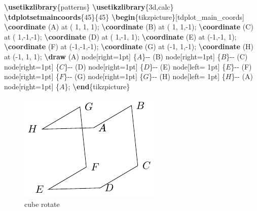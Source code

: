 \documentclass[
]{book}
\newenvironment{Shaded}{\begin{snugshade}}{\end{snugshade}}
\newcommand{\ExtensionTok}[1]{#1}
\newcommand{\FunctionTok}[1]{\textcolor[rgb]{0.13,0.29,0.53}{\textbf{#1}}}
\newcommand{\KeywordTok}[1]{\textcolor[rgb]{0.13,0.29,0.53}{\textbf{#1}}}
\newcommand{\NormalTok}[1]{#1}
\newcommand{\SpecialStringTok}[1]{\textcolor[rgb]{0.31,0.60,0.02}{#1}}
\theoremstyle{definition}
\theoremstyle{definition}
\theoremstyle{definition}
\theoremstyle{definition}
\theoremstyle{remark}
\begin{document}
\begin{Shaded}
\begin{Highlighting}[]
\FunctionTok{\textbackslash{}usetikzlibrary}\NormalTok{\{patterns\}}
\FunctionTok{\textbackslash{}usetikzlibrary}\NormalTok{\{3d,calc\}}
\FunctionTok{\textbackslash{}tdplotsetmaincoords}\NormalTok{\{45\}\{45\}}
\KeywordTok{\textbackslash{}begin}\NormalTok{\{}\ExtensionTok{tikzpicture}\NormalTok{\}[tdplot\_main\_coords]}
  \FunctionTok{\textbackslash{}coordinate}\NormalTok{ (A) at ( 1, 1, 1);}
  \FunctionTok{\textbackslash{}coordinate}\NormalTok{ (B) at ( 1, 1,{-}1);}
  \FunctionTok{\textbackslash{}coordinate}\NormalTok{ (C) at ( 1,{-}1,{-}1);}
  \FunctionTok{\textbackslash{}coordinate}\NormalTok{ (D) at ( 1,{-}1, 1);}
  \FunctionTok{\textbackslash{}coordinate}\NormalTok{ (E) at ({-}1,{-}1, 1);}
  \FunctionTok{\textbackslash{}coordinate}\NormalTok{ (F) at ({-}1,{-}1,{-}1);}
  \FunctionTok{\textbackslash{}coordinate}\NormalTok{ (G) at ({-}1, 1,{-}1);}
  \FunctionTok{\textbackslash{}coordinate}\NormalTok{ (H) at ({-}1, 1, 1);}
  \FunctionTok{\textbackslash{}draw}\NormalTok{ (A) node[right=1pt] \{}\SpecialStringTok{$A$}\NormalTok{\}{-}{-}}
\NormalTok{        (B) node[right=1pt] \{}\SpecialStringTok{$B$}\NormalTok{\}{-}{-}}
\NormalTok{        (C) node[right=1pt] \{}\SpecialStringTok{$C$}\NormalTok{\}{-}{-}}
\NormalTok{        (D) node[right=1pt] \{}\SpecialStringTok{$D$}\NormalTok{\}{-}{-}}
\NormalTok{        (E) node[left= 1pt] \{}\SpecialStringTok{$E$}\NormalTok{\}{-}{-}}
\NormalTok{        (F) node[right=1pt] \{}\SpecialStringTok{$F$}\NormalTok{\}{-}{-}}
\NormalTok{        (G) node[right=1pt] \{}\SpecialStringTok{$G$}\NormalTok{\}{-}{-}}
\NormalTok{        (H) node[left= 1pt] \{}\SpecialStringTok{$H$}\NormalTok{\}{-}{-}}
\NormalTok{        (A) node[right=1pt] \{}\SpecialStringTok{$A$}\NormalTok{\};}
\KeywordTok{\textbackslash{}end}\NormalTok{\{}\ExtensionTok{tikzpicture}\NormalTok{\}}
\end{Highlighting}
\end{Shaded}

\begin{figure}
\includegraphics[width=0.75\linewidth]{202401311000-TikZ_files/figure-latex/unnamed-chunk-65-1} \caption{cube rotate}\label{fig:unnamed-chunk-65}
\end{figure}
\end{document}
